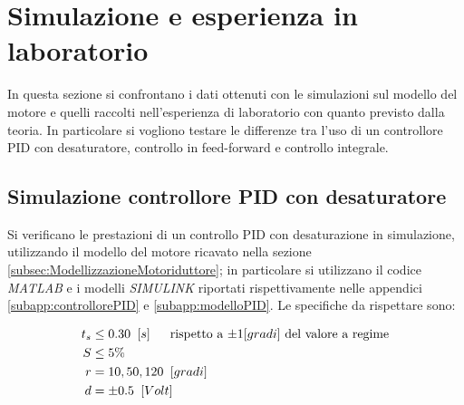 \section{Simulazione e esperienza in laboratorio}
\label{sec:simLab}

	In questa sezione si confrontano i dati ottenuti con le simulazioni sul modello del motore e quelli raccolti nell'esperienza di laboratorio con quanto previsto dalla teoria. In particolare si vogliono testare le differenze tra l'uso di un controllore PID con desaturatore, controllo in feed-forward e controllo integrale.
	
	\subsection{Simulazione controllore PID con desaturatore}
	\label{subsec:PIDdesaSim}
	
		Si verificano le prestazioni di un controllo PID con desaturazione in simulazione, utilizzando il modello del motore ricavato nella sezione \ref{subsec:ModellizzazioneMotoriduttore}; in particolare si utilizzano il codice \textit{MATLAB} e i modelli \textit{SIMULINK} riportati rispettivamente nelle appendici \ref{subapp:controllorePID} e \ref{subapp:modelloPID}. 
		\newline Le specifiche da rispettare sono:
		
		\begin{align*}
			t_s &\le 0.30 \singleSpacing [s] \trippleSpacing \textnormal{rispetto a $\pm 1 [gradi]$ del valore a regime} \\
			S &\le 5 \% \\
			r &= 10,50,120 \singleSpacing [gradi] \\
			d &= \pm 0.5 \singleSpacing [Volt] \\
		\end{align*}
		
